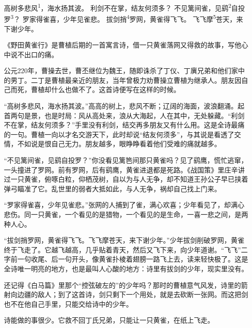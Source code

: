 
\begin{poem}
高树多悲风\textsuperscript{1}，海水扬其波。
利剑不在掌，结友何须多？
不见篱间雀，见鹞\textsuperscript{2}自投罗\textsuperscript{3}？
罗家得雀喜，少年见雀悲。
拔剑捎\textsuperscript{4}罗网，黄雀得飞飞。
飞飞摩\textsuperscript{5}苍天，来下谢少年。
\end{poem}

\begin{annotations}
\end{annotations}

\begin{appreciation}
《野田黄雀行》是曹植后期的一首寓言诗，借一只黄雀落网又得救的故事，写他心中说不出口的痛。

公元220年，曹操去世，曹丕继位为魏王，随即诛杀了丁仪、丁廙兄弟和他们家中的男丁。二丁是曹植最亲近的朋友，当年曾极力劝曹操立曹植为继承人。朋友因自己而死，曹植却什么也做不了。这首诗便写在这样的时候。

“高树多悲风，海水扬其波。”高高的树上，悲风不断；辽阔的海面，波浪翻涌。起首两句是景，也是时局：风从高处来，浪从大海起，人在其中，无处躲藏。“利剑不在掌，结友何须多？”手里没有利剑，结交再多朋友又有什么用。这是全诗最痛的一句。曹植一向以才名交游天下，此时却说“结友何须多”，与其说是看透了交情，不如说是恨自己无力。朋友越多，眼睁睁看着他们受难的痛就越多。

“不见篱间雀，见鹞自投罗？”你没看见篱笆间那只黄雀吗？见了鹞鹰，慌忙逃窜，一头撞进了罗网。前有罗网，后有鹞鹰，黄雀进退都是死路。《战国策》里庄辛讲过一只黄雀，俯啄白粒，仰栖茂树，自以为与人无争，却不知道王孙公子早已挟着弹弓瞄准了它。乱世里的弱者大抵如此，与人无争，祸却自己找上门来。

“罗家得雀喜，少年见雀悲。”张网的人捕到了雀，满心欢喜；少年看见了，却满心悲伤。同一只黄雀，一个看见的是猎物，一个看见的是生命，一喜一悲之间，是两种人心。

“拔剑捎罗网，黄雀得飞飞。飞飞摩苍天，来下谢少年。”少年拔剑削破罗网，黄雀终于飞走了。它越飞越高，几乎贴着青天，然后又飞下来，向少年道谢。“飞飞”二字前一句收尾、后一句开头，像黄雀扑棱着翅膀一路飞上去，读来轻快极了。这是全诗唯一明亮的地方，也是最叫人心酸的地方：诗里有拔剑的少年，现实里没有。

还记得《白马篇》里那个“控弦破左的”的少年吗？那时的曹植意气风发，诗里的箭射向边疆的敌人；到了这首诗，剑只剩下一个用处，就是去砍断一张网。而这把剑也不在他自己手里，只能交给诗中的少年。

诗能做的事很少。它救不回丁氏兄弟，只能让一只黄雀，在纸上飞走。
\end{appreciation}
